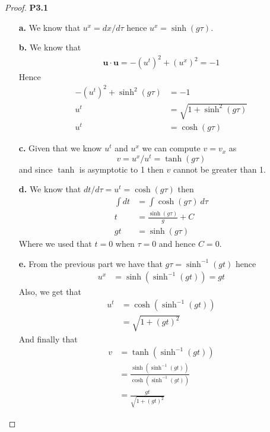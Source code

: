 \documentclass[11pt]{article}
\theoremstyle{definition}
\begin{document}
\begin{proof}{\textbf{P3.1}}
    \begin{itemize}
        \item[\bf{a.}] We know that $u^x = dx/d\tau$ hence $u^x = \sinh(g\tau)$.
        \item[\bf{b.}] We know that
        \begin{align*}
            \bm{u}\cdot\bm{u} = -(u^{t})^2 + (u^{x})^2 = -1
        \end{align*}
        Hence
        \begin{align*}
            -(u^{t})^2 + \sinh^2(g\tau) &= -1\\
            u^t &= \sqrt{1 +\sinh^2(g\tau)}\\
            u^t &= \cosh(g\tau)
        \end{align*}
        \item[\bf{c.}] Given that we know $u^t$ and $u^x$ we can compute
        $v = v_x$ as
        $$v = u^x/u^t = \tanh(g\tau)$$
        and since $\tanh$ is asymptotic to 1 then $v$ cannot be greater than 1.

        \item[\bf{d.}] We know that $dt/d\tau = u^t = \cosh(g\tau)$ then
        \begin{align*}
            \int dt &= \int \cosh(g\tau)~d\tau\\
            t &= \frac{\sinh(g\tau)}{g} + C\\
            gt &= \sinh(g\tau)
        \end{align*}
        Where we used that $t=0$ when $\tau=0$ and hence $C = 0$.

        \item[\bf{e.}] From the previous part we have that $g\tau = \sinh^{-1}(gt)$
        hence
        \begin{align*}
            u^x &= \sinh(\sinh^{-1}(gt)) = gt
        \end{align*}
        Also, we get that
        \begin{align*}
            u^t &= \cosh(\sinh^{-1}(gt))\\
                &= \sqrt{1 + (gt)^2}
        \end{align*}
        And finally that
        \begin{align*}
            v &= \tanh(\sinh^{-1}(gt))\\
                &= \frac{\sinh(\sinh^{-1}(gt))}{\cosh(\sinh^{-1}(gt))}\\
                &= \frac{gt}{\sqrt{1 + (gt)^2}}
        \end{align*}
    \end{itemize}
\end{proof}
\end{document}
